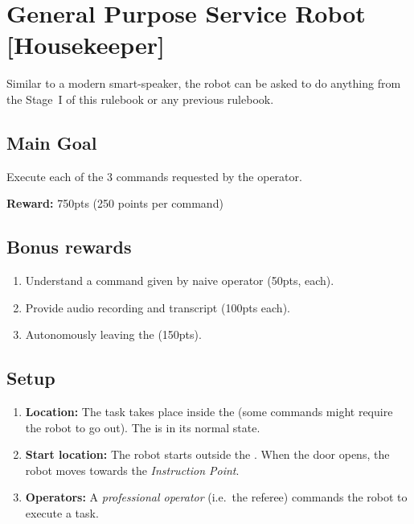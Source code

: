 \section{General Purpose Service Robot [Housekeeper]}
\label{test:gpsr}
Similar to a modern smart-speaker, the robot can be asked to do anything from the Stage~I of this rulebook or any previous rulebook.


\subsection*{Main Goal}
Execute each of the 3 commands requested by the operator.

\noindent\textbf{Reward:} 750pts (250 points per command)\\

\subsection*{Bonus rewards}
\begin{enumerate}[nosep]
	\item Understand a command given by naive operator (50pts, each).
	\item Provide audio recording and transcript (100pts each).
	\item Autonomously leaving the \Arena{} (150pts).
\end{enumerate}

%
%
\subsection*{Setup}
\begin{enumerate}[nosep]
	\item \textbf{Location:} The task takes place inside the \Arena{} (some commands might require the robot to go out). The \Arena{} is in its normal state.

	\item \textbf{Start location:} The robot starts outside the \Arena{}. When the door opens, the robot moves towards the \textit{Instruction Point}.

	\item \textbf{Operators:} A \emph{professional operator} (i.e.~the referee) commands the robot to execute a task.
\end{enumerate}


